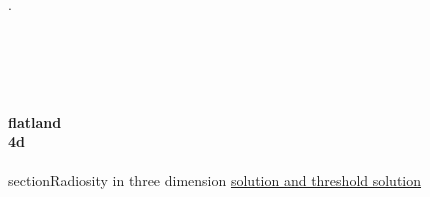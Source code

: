 % 






















.\\\\\\\\\\\\{\bf flatland}\\

{\bf 4d}\\
\\section{Radiosity in three dimension} %
\label{sec:radiosity_in_three_dimension}
\underline{solution and threshold solution}
